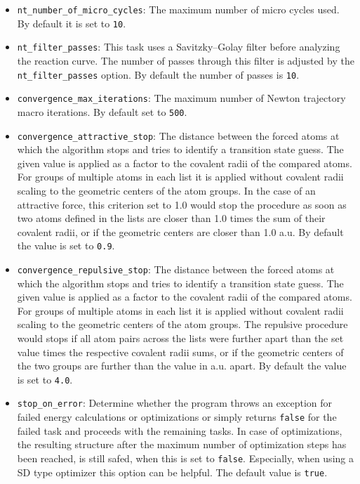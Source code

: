 \documentclass[]{tufte-book}
\begin{document}
\begin{itemize}
\item \texttt{nt\_number\_of\_micro\_cycles}: The maximum number of micro cycles used. By default it is set to \texttt{10}.
\item \texttt{nt\_filter\_passes}: This task uses a Savitzky--Golay filter before analyzing the reaction curve. The number of passes
through this filter is adjusted by the \texttt{nt\_filter\_passes} option. By default the number of passes is \texttt{10}.
\item \texttt{convergence\_max\_iterations}: The maximum number of Newton trajectory macro iterations. By default set to \texttt{500}.
\item \texttt{convergence\_attractive\_stop}: The distance between the forced atoms at which the algorithm stops and tries to identify
a transition state guess. The given value is applied as a factor to the covalent radii of the compared atoms.
For groups of multiple atoms in each list it is applied without covalent radii scaling to the geometric centers of the atom groups.
In the case of an attractive force, this criterion set to 1.0 would stop the procedure as soon as two atoms defined in the lists
are closer than 1.0 times the sum of their covalent radii, or if the geometric centers are closer than 1.0 a.u.
By default the value is set to \texttt{0.9}.
\item \texttt{convergence\_repulsive\_stop}: The distance between the forced atoms at which the algorithm stops and tries to identify
a transition state guess. The given value is applied as a factor to the covalent radii of the compared atoms.
For groups of multiple atoms in each list it is applied without covalent radii scaling to the geometric centers of the atom groups.
The repulsive procedure would stops if all atom pairs across the lists were further apart than the set value times the respective
covalent radii sums, or if the geometric centers of the two groups are further than the value in a.u. apart.
By default the value is set to \texttt{4.0}.
\item \texttt{stop\_on\_error}: Determine whether the program throws an exception for failed energy calculations or optimizations or simply returns \texttt{false} for the failed task and proceeds with the remaining tasks. In case of optimizations, the resulting structure after the maximum number of optimization steps has been reached, is still safed, when this is set to \texttt{false}. Especially, when using a SD type optimizer this option can be helpful. The default value is \texttt{true}.
\end{itemize}
\end{document}
